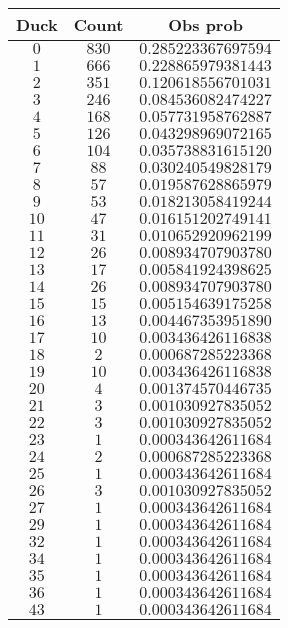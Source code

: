 \begin{tabular}{ccc} \toprule
Duck & Count & Obs prob            \\\midrule
$0$  & $830$ & $0.285223367697594$ \\
$1$  & $666$ & $0.228865979381443$ \\
$2$  & $351$ & $0.120618556701031$ \\
$3$  & $246$ & $0.084536082474227$ \\
$4$  & $168$ & $0.057731958762887$ \\
$5$  & $126$ & $0.043298969072165$ \\
$6$  & $104$ & $0.035738831615120$ \\
$7$  & $88$  & $0.030240549828179$ \\
$8$  & $57$  & $0.019587628865979$ \\
$9$  & $53$  & $0.018213058419244$ \\
$10$ & $47$  & $0.016151202749141$ \\
$11$ & $31$  & $0.010652920962199$ \\
$12$ & $26$  & $0.008934707903780$ \\
$13$ & $17$  & $0.005841924398625$ \\
$14$ & $26$  & $0.008934707903780$ \\
$15$ & $15$  & $0.005154639175258$ \\
$16$ & $13$  & $0.004467353951890$ \\
$17$ & $10$  & $0.003436426116838$ \\
$18$ & $2$   & $0.000687285223368$ \\
$19$ & $10$  & $0.003436426116838$ \\
$20$ & $4$   & $0.001374570446735$ \\
$21$ & $3$   & $0.001030927835052$ \\
$22$ & $3$   & $0.001030927835052$ \\
$23$ & $1$   & $0.000343642611684$ \\
$24$ & $2$   & $0.000687285223368$ \\
$25$ & $1$   & $0.000343642611684$ \\
$26$ & $3$   & $0.001030927835052$ \\
$27$ & $1$   & $0.000343642611684$ \\
$29$ & $1$   & $0.000343642611684$ \\
$32$ & $1$   & $0.000343642611684$ \\
$34$ & $1$   & $0.000343642611684$ \\
$35$ & $1$   & $0.000343642611684$ \\
$36$ & $1$   & $0.000343642611684$ \\
$43$ & $1$   & $0.000343642611684$ \\\bottomrule
\end{tabular}
